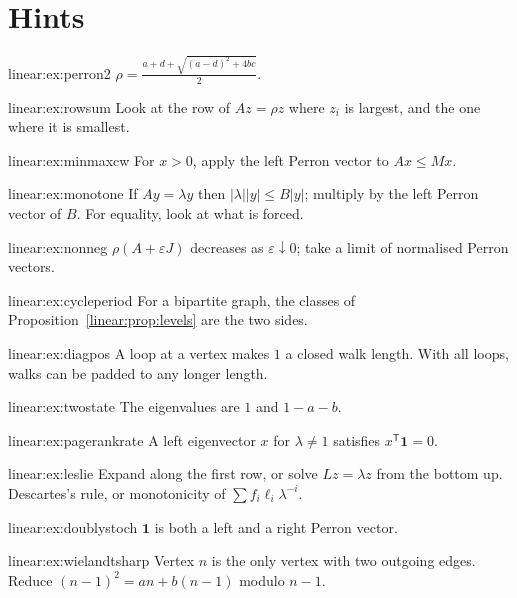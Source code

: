 \section{Hints}

\begin{hint}{linear:ex:perron2}
$\rho=\frac{a+d+\sqrt{(a-d)^2+4bc}}2$.
\end{hint}
\begin{hint}{linear:ex:rowsum}
Look at the row of $Az=\rho z$ where $z_i$ is largest, and the one where it is smallest.
\end{hint}
\begin{hint}{linear:ex:minmaxcw}
For $x>0$, apply the left Perron vector to $Ax\le Mx$.
\end{hint}
\begin{hint}{linear:ex:monotone}
If $Ay=\lambda y$ then $|\lambda||y|\le B|y|$; multiply by the left Perron vector of $B$. For equality, look at what is forced.
\end{hint}
\begin{hint}{linear:ex:nonneg}
$\rho(A+\varepsilon J)$ decreases as $\varepsilon\downarrow0$; take a limit of normalised Perron vectors.
\end{hint}
\begin{hint}{linear:ex:cycleperiod}
For a bipartite graph, the classes of Proposition~\ref{linear:prop:levels} are the two sides.
\end{hint}
\begin{hint}{linear:ex:diagpos}
A loop at a vertex makes $1$ a closed walk length. With all loops, walks can be padded to any longer length.
\end{hint}
\begin{hint}{linear:ex:twostate}
The eigenvalues are $1$ and $1-a-b$.
\end{hint}
\begin{hint}{linear:ex:pagerankrate}
A left eigenvector $x$ for $\lambda\ne1$ satisfies $x^{\mathsf T}\mathbf 1=0$.
\end{hint}
\begin{hint}{linear:ex:leslie}
Expand along the first row, or solve $Lz=\lambda z$ from the bottom up. Descartes's rule, or monotonicity of $\sum f_i\ell_i
\lambda^{-i}$.
\end{hint}
\begin{hint}{linear:ex:doublystoch}
$\mathbf 1$ is both a left and a right Perron vector.
\end{hint}
\begin{hint}{linear:ex:wielandtsharp}
Vertex $n$ is the only vertex with two outgoing edges. Reduce $(n-1)^2=an+b(n-1)$ modulo $n-1$.
\end{hint}

